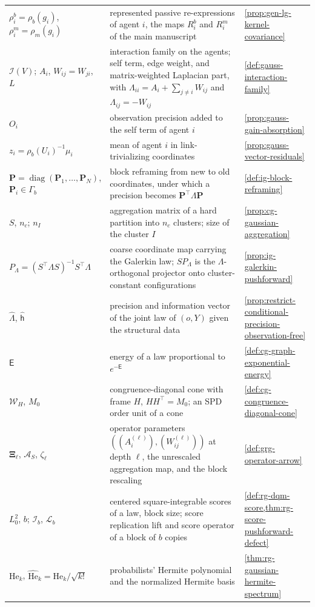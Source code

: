 {\begin{longtable}{@{}>{\raggedright\arraybackslash}p{}
>{\raggedright\arraybackslash}p{}
>{\raggedright\arraybackslash}p{}@{}}
$\rho^b_i=\rho_b(g_i)$, $\rho^m_i=\rho_m(g_i)$ & represented passive re-expressions of agent $i$, the maps $R_i^b$ and $R_i^m$ of the main manuscript & \cref{prop:gen-lg-kernel-covariance} \\
$\mathcal I(V)$; $A_i$, $W_{ij}=W_{ji}$, $L$ & interaction family on the agents; self term, edge weight, and matrix-weighted Laplacian part, with $\Lambda_{ii}=A_i+\sum_{j\neq i}W_{ij}$ and $\Lambda_{ij}=-W_{ij}$ & \cref{def:gauss-interaction-family} \\
$O_i$ & observation precision added to the self term of agent $i$ & \cref{prop:gauss-gain-absorption} \\
$z_i=\rho_b(U_i)^{-1}\mu_i$ & mean of agent $i$ in link-trivializing coordinates & \cref{prop:gauss-vector-residuals} \\
$\mathbf P=\operatorname{diag}(\mathbf P_1,\ldots,\mathbf P_N)$, $\mathbf P_i\in\Gamma_b$ & block reframing from new to old coordinates, under which a precision becomes $\mathbf P^\top\Lambda\mathbf P$ & \cref{def:ig-block-reframing} \\
$S$, $n_c$; $n_I$ & aggregation matrix of a hard partition into $n_c$ clusters; size of the cluster $I$ & \cref{prop:cg-gaussian-aggregation} \\
$P_\Lambda=(S^\top\Lambda S)^{-1}S^\top\Lambda$ & coarse coordinate map carrying the Galerkin law; $SP_\Lambda$ is the $\Lambda$-orthogonal projector onto cluster-constant configurations & \cref{prop:ig-galerkin-pushforward} \\
$\widehat\Lambda$, $\widehat{\mathsf h}$ & precision and information vector of the joint law of $(o,Y)$ given the structural data & \cref{prop:restrict-conditional-precision-observation-free} \\
$\mathsf E$ & energy of a law proportional to $e^{-\mathsf E}$ & \cref{def:cg-graph-exponential-energy} \\
$\mathcal W_H$, $M_0$ & congruence-diagonal cone with frame $H$, $HH^\top=M_0$; an SPD order unit of a cone & \cref{def:cg-congruence-diagonal-cone} \\
$\boldsymbol\Xi_\ell$, $\mathcal A_S$, $\zeta_\ell$ & operator parameters $((A_i^{(\ell)}),(W_{ij}^{(\ell)}))$ at depth $\ell$, the unrescaled aggregation map, and the block rescaling & \cref{def:grg-operator-arrow} \\
$L^2_0$, $b$; $\mathscr I_b$, $\mathscr L_b$ & centered square-integrable scores of a law, block size; score replication lift and score operator of a block of $b$ copies & \cref{def:rg-dqm-score,thm:rg-score-pushforward-defect} \\
$\mathrm{He}_k$, $\widehat{\mathrm{He}}_k=\mathrm{He}_k/\sqrt{k!}$ & probabilists' Hermite polynomial and the normalized Hermite basis & \cref{thm:rg-gaussian-hermite-spectrum} \\
\end{longtable}
}

